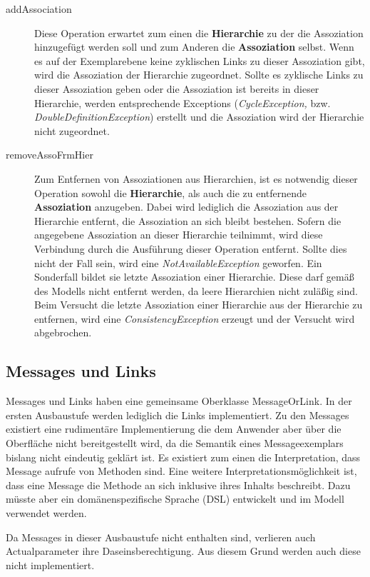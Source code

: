 \begin{description}
\item[addAssociation] Diese Operation erwartet zum einen die \textbf{Hierarchie} zu der die Assoziation hinzugefügt werden soll und zum Anderen die \textbf{Assoziation} selbst.
Wenn es auf der Exemplarebene keine zyklischen Links zu dieser Assoziation gibt, wird die Assoziation der Hierarchie zugeordnet. Sollte es zyklische Links
zu dieser Assoziation geben oder die Assoziation ist bereits in dieser Hierarchie, werden entsprechende Exceptions (\emph{CycleException,} bzw. \emph{DoubleDefinitionException}) 
erstellt und die Assoziation wird der Hierarchie nicht zugeordnet.
\item[removeAssoFrmHier] Zum Entfernen von Assoziationen aus Hierarchien, ist es notwendig dieser Operation sowohl die \textbf{Hierarchie}, als auch die zu entfernende 
\textbf{Assoziation} anzugeben. Dabei wird lediglich die Assoziation aus der Hierarchie entfernt, die Assoziation an sich bleibt bestehen. 
Sofern die angegebene Assoziation an dieser Hierarchie teilnimmt, wird diese Verbindung durch die Ausführung dieser Operation entfernt. 
Sollte dies nicht der Fall sein, wird eine \emph{NotAvailableException} geworfen. Ein Sonderfall bildet sie letzte Assoziation einer
Hierarchie. Diese darf gemäß des Modells nicht entfernt werden, da leere Hierarchien nicht zuläßig sind. Beim Versucht die letzte
Assoziation einer Hierarchie aus der Hierarchie zu entfernen, wird eine \emph{ConsistencyException} erzeugt und der Versucht wird abgebrochen. 
\end{description}



\subsection{Messages und Links}

Messages und Links haben eine gemeinsame Oberklasse MessageOrLink. In der ersten Ausbaustufe werden lediglich die Links implementiert. Zu den Messages existiert eine rudimentäre
Implementierung die dem Anwender aber über die Oberfläche nicht bereitgestellt wird, da die 
Semantik eines Messageexemplars bislang nicht eindeutig geklärt ist.
Es existiert zum einen die Interpretation, dass Message aufrufe von Methoden sind. Eine weitere Interpretationsmöglichkeit ist, dass eine Message die Methode an sich inklusive ihres Inhalts beschreibt. 
Dazu müsste aber ein domänenspezifische Sprache (DSL) entwickelt und im Modell verwendet werden.

Da Messages in dieser Ausbaustufe nicht enthalten sind, verlieren auch Actualparameter ihre Daseinsberechtigung. Aus diesem Grund werden auch diese nicht implementiert.
 \vspace{15pt}

